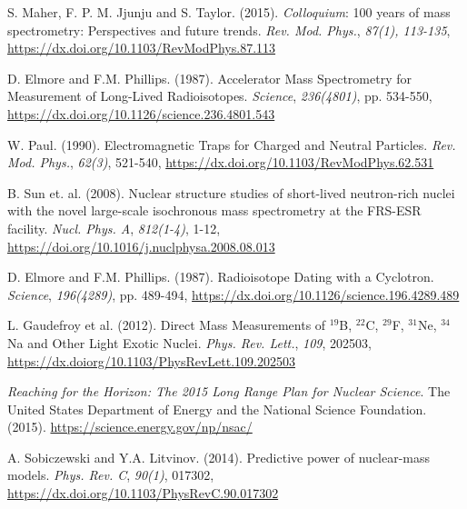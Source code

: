 \documentclass[12pt]{amsart}
\begin{document}
\begin{thebibliography}{8}


S. Maher, F. P. M. Jjunju and S. Taylor. (2015). \textit{Colloquium}: 100 years of mass spectrometry: Perspectives and future trends. \textit{Rev. Mod. Phys.}, \textit{87(1), 113-135}, 
\url{https://dx.doi.org/10.1103/RevModPhys.87.113}

D. Elmore and F.M. Phillips. (1987). Accelerator Mass Spectrometry for Measurement of Long-Lived Radioisotopes. \textit{Science}, \textit{236(4801)}, pp. 534-550,
\url{https://dx.doi.org/10.1126/science.236.4801.543}

W. Paul. (1990). Electromagnetic Traps for Charged and Neutral Particles. \textit{Rev. Mod. Phys.}, \textit{62(3)}, 521-540,
\url{ https://dx.doi.org/10.1103/RevModPhys.62.531}

B. Sun et. al. (2008). Nuclear structure studies of short-lived neutron-rich nuclei with the novel large-scale isochronous mass spectrometry at the FRS-ESR facility. \textit{Nucl. Phys. A}, \textit{812(1-4)}, 1-12, \url{https://doi.org/10.1016/j.nuclphysa.2008.08.013}

D. Elmore and F.M. Phillips. (1987). Radioisotope Dating with a Cyclotron. \textit{Science}, \textit{196(4289)}, pp. 489-494, \url{https://dx.doi.org/10.1126/science.196.4289.489}

L. Gaudefroy et al. (2012). Direct Mass Measurements of $^{19}$B, $^{22}$C, $^{29}$F, $^{31}$Ne, $^{34}$Na and Other Light Exotic Nuclei. \textit{Phys. Rev. Lett.}, \textit{109}, 202503, \url{https://dx.doiorg/10.1103/PhysRevLett.109.202503}

\textit{Reaching for the Horizon: The 2015 Long Range Plan for Nuclear Science}. The United States Department of Energy and the National Science Foundation. (2015). \url{https://science.energy.gov/np/nsac/}

A. Sobiczewski and Y.A. Litvinov. (2014). Predictive power of nuclear-mass models. \textit{Phys. Rev. C}, \textit{90(1)}, 017302, \url{https://dx.doi.org/10.1103/PhysRevC.90.017302}
\end{thebibliography}
\end{document}
